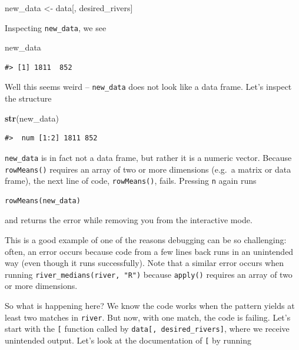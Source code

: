 \documentclass[
]{book}
\newenvironment{Shaded}{\begin{snugshade}}{\end{snugshade}}
\newcommand{\KeywordTok}[1]{\textcolor[rgb]{0.13,0.29,0.53}{\textbf{#1}}}
\newcommand{\NormalTok}[1]{#1}
\newcommand{\StringTok}[1]{\textcolor[rgb]{0.31,0.60,0.02}{#1}}
\begin{document}
\begin{Shaded}
\begin{Highlighting}[]
\NormalTok{new_data <-}\StringTok{ }\NormalTok{data[, desired_rivers]}
\end{Highlighting}
\end{Shaded}

Inspecting \texttt{new\_data}, we see

\begin{Shaded}
\begin{Highlighting}[]
\NormalTok{new_data}
\end{Highlighting}
\end{Shaded}

\begin{verbatim}
#> [1] 1811  852
\end{verbatim}

Well this seems weird -- \texttt{new\_data} does not look like a data frame. Let's inspect the structure

\begin{Shaded}
\begin{Highlighting}[]
\KeywordTok{str}\NormalTok{(new_data)}
\end{Highlighting}
\end{Shaded}

\begin{verbatim}
#>  num [1:2] 1811 852
\end{verbatim}

\texttt{new\_data} is in fact not a data frame, but rather it is a numeric vector. Because \texttt{rowMeans()} requires an array of two or more dimensions (e.g.~a matrix or data frame), the next line of code, \texttt{rowMeans()}, fails. Pressing \texttt{n} again runs

\begin{verbatim}
rowMeans(new_data)
\end{verbatim}

and returns the error while removing you from the interactive mode.

This is a good example of one of the reasons debugging can be so challenging: often, an error occurs because code from a few lines back runs in an unintended way (even though it runs successfully). Note that a similar error occurs when running \texttt{river\_medians(river,\ "R")} because \texttt{apply()} requires an array of two or more dimensions.

So what is happening here? We know the code works when the pattern yields at least two matches in \texttt{river}. But now, with one match, the code is failing. Let's start with the \texttt{{[}} function called by \texttt{data{[},\ desired\_rivers{]}}, where we receive unintended output. Let's look at the documentation of \texttt{{[}} by running
\end{document}
